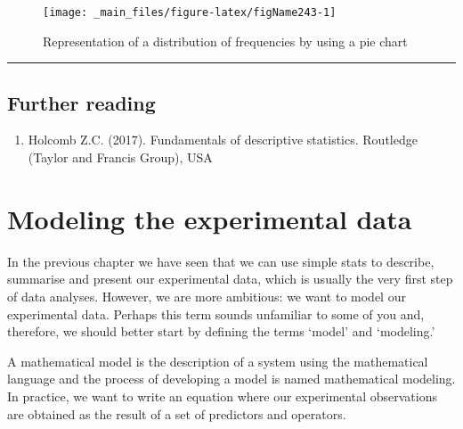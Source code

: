 \documentclass[a4paper,12pt,oneside]{book}
\providecommand{\tightlist}{%
  \setlength{\itemsep}{0pt}\setlength{\parskip}{0pt}}
\newenvironment{Shaded}{\begin{snugshade}}{\end{snugshade}}
\newcommand{\SpecialCharTok}[1]{#1}
\newcommand{\FunctionTok}[1]{#1}
\newcommand{\NormalTok}[1]{#1}
\begin{document}
\begin{Shaded}
\end{Shaded}

\begin{figure}

{\centering \texttt{[image: \_main\_files/figure-latex/figName243-1]} 

}

\caption{Representation of a distribution of frequencies by using a pie chart}\label{fig:figName243}
\end{figure}

\begin{center}\rule{0.5\linewidth}{0.5pt}\end{center}

\hypertarget{further-reading}{%
\section{Further reading}\label{further-reading}}

\begin{enumerate}
\def\labelenumi{\arabic{enumi}.}
\tightlist
\item
  Holcomb Z.C. (2017). Fundamentals of descriptive statistics. Routledge (Taylor and Francis Group), USA
\end{enumerate}

\hypertarget{modeling-the-experimental-data}{%
\chapter{Modeling the experimental data}\label{modeling-the-experimental-data}}

In the previous chapter we have seen that we can use simple stats to describe, summarise and present our experimental data, which is usually the very first step of data analyses. However, we are more ambitious: we want to model our experimental data. Perhaps this term sounds unfamiliar to some of you and, therefore, we should better start by defining the terms `model' and `modeling.'

A mathematical model is the description of a system using the mathematical language and the process of developing a model is named mathematical modeling. In practice, we want to write an equation where our experimental observations are obtained as the result of a set of predictors and operators.
\end{document}
